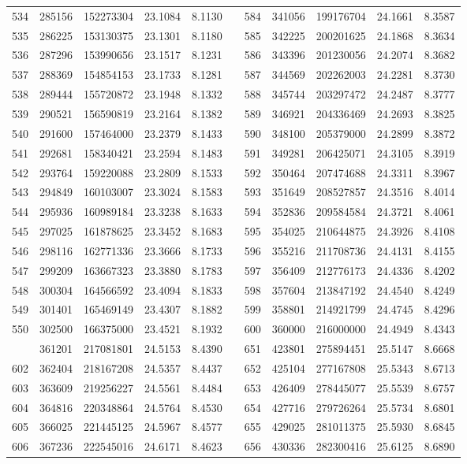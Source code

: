 \begin{longtable}{rrrrrrrrrrr}
534&285156&152273304&23.1084&8.1130&&584&341056&199176704&24.1661&8.3587\\
535&286225&153130375&23.1301&8.1180&&585&342225&200201625&24.1868&8.3634\\
536&287296&153990656&23.1517&8.1231&&586&343396&201230056&24.2074&8.3682\\
537&288369&154854153&23.1733&8.1281&&587&344569&202262003&24.2281&8.3730\\
538&289444&155720872&23.1948&8.1332&&588&345744&203297472&24.2487&8.3777\\
539&290521&156590819&23.2164&8.1382&&589&346921&204336469&24.2693&8.3825\\
540&291600&157464000&23.2379&8.1433&&590&348100&205379000&24.2899&8.3872\\
541&292681&158340421&23.2594&8.1483&&591&349281&206425071&24.3105&8.3919\\
542&293764&159220088&23.2809&8.1533&&592&350464&207474688&24.3311&8.3967\\
543&294849&160103007&23.3024&8.1583&&593&351649&208527857&24.3516&8.4014\\
544&295936&160989184&23.3238&8.1633&&594&352836&209584584&24.3721&8.4061\\
545&297025&161878625&23.3452&8.1683&&595&354025&210644875&24.3926&8.4108\\
546&298116&162771336&23.3666&8.1733&&596&355216&211708736&24.4131&8.4155\\
547&299209&163667323&23.3880&8.1783&&597&356409&212776173&24.4336&8.4202\\
548&300304&164566592&23.4094&8.1833&&598&357604&213847192&24.4540&8.4249\\
549&301401&165469149&23.4307&8.1882&&599&358801&214921799&24.4745&8.4296\\
550&302500&166375000&23.4521&8.1932&&600&360000&216000000&24.4949&8.4343\\
\newpage
601&361201&217081801&24.5153&8.4390&&651&423801&275894451&25.5147&8.6668\\
602&362404&218167208&24.5357&8.4437&&652&425104&277167808&25.5343&8.6713\\
603&363609&219256227&24.5561&8.4484&&653&426409&278445077&25.5539&8.6757\\
604&364816&220348864&24.5764&8.4530&&654&427716&279726264&25.5734&8.6801\\
605&366025&221445125&24.5967&8.4577&&655&429025&281011375&25.5930&8.6845\\
606&367236&222545016&24.6171&8.4623&&656&430336&282300416&25.6125&8.6890\\

\end{longtable}
